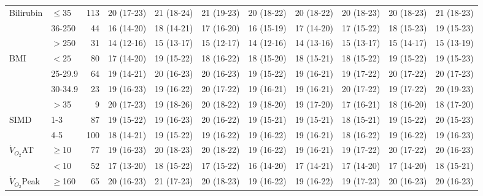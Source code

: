 \begin{sidewaystable}[p]
\begin{tabular}{|llr | c c c c c c c c|}
		Bilirubin           & $\leq$35  & 113 & 20 (17-23) & 21 (18-24) & 21 (19-23) & 20 (18-22) & 20 (18-22) & 20 (18-23) & 20 (18-23) & 21 (18-23) \\
		                    & 36-250    & 44  & 16 (14-20) & 18 (14-21) & 17 (16-20) & 16 (15-19) & 17 (14-20) & 17 (15-22) & 18 (15-23) & 19 (15-23) \\
		                    & $>$250    & 31  & 14 (12-16) & 15 (13-17) & 15 (12-17) & 14 (12-16) & 14 (13-16) & 15 (13-17) & 15 (14-17) & 15 (13-19) \\
		BMI                 & $<25$     & 80  & 17 (14-20) & 19 (15-22) & 18 (16-22) & 18 (15-20) & 18 (15-21) & 18 (15-22) & 19 (15-22) & 19 (15-23) \\
		                    & 25-29.9   & 64  & 19 (14-21) & 20 (16-23) & 20 (16-23) & 19 (15-22) & 19 (16-21) & 19 (17-22) & 20 (17-22) & 20 (17-23) \\
		                    & 30-34.9   & 23  & 19 (16-23) & 19 (16-22) & 20 (17-22) & 19 (16-21) & 19 (16-21) & 20 (17-22) & 19 (17-22) & 20 (19-23) \\
		                    & $>$35     & 9   & 20 (17-23) & 19 (18-26) & 20 (18-22) & 19 (18-20) & 19 (17-20) & 17 (16-21) & 18 (16-20) & 18 (17-20) \\
		SIMD                & 1-3       & 87  & 19 (15-22) & 19 (16-23) & 20 (16-22) & 19 (15-21) & 19 (15-21) & 18 (15-21) & 19 (15-22) & 20 (15-23) \\
		                    & 4-5       & 100 & 18 (14-21) & 19 (15-22) & 19 (16-22) & 19 (16-22) & 19 (16-21) & 18 (16-22) & 19 (16-22) & 19 (16-23) \\
		$\dot{V}_{O_2}$AT   & $\geq$10  & 77  & 19 (16-23) & 20 (18-23) & 20 (18-22) & 19 (16-22) & 19 (16-21) & 19 (17-22) & 20 (17-22) & 20 (16-23) \\
		                    & $<$10     & 52  & 17 (13-20) & 18 (15-22) & 17 (15-22) & 16 (14-20) & 17 (14-21) & 17 (14-20) & 17 (14-20) & 18 (15-21) \\
		$\dot{V}_{O_2}$Peak & $\geq$160 & 65  & 20 (16-23) & 21 (17-23) & 20 (18-23) & 19 (16-22) & 19 (16-22) & 19 (17-23) & 20 (16-23) & 20 (16-23) \\

\end{tabular}
\end{sidewaystable}
